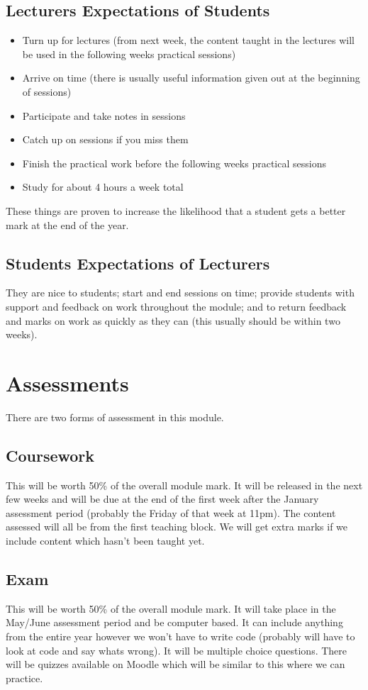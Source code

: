 \subsection*{Lecturers Expectations of Students}
\begin{itemize}
    \item Turn up for lectures (from next week, the content taught in the lectures will be used in the following weeks practical sessions)
    \item Arrive on time (there is usually useful information given out at the beginning of sessions)
    \item Participate and take notes in sessions
    \item Catch up on sessions if you miss them
    \item Finish the practical work before the following weeks practical sessions
    \item Study for about 4 hours a week total
\end{itemize}
These things are proven to increase the likelihood that a student gets a better mark at the end of the year.
\subsection*{Students Expectations of Lecturers}
They are nice to students; start and end sessions on time; provide students with support and feedback on work throughout the module; and to return feedback and marks on work as quickly as they can (this usually should be within two weeks).

\section*{Assessments}
There are two forms of assessment in this module.
\subsection*{Coursework}
This will be worth 50\% of the overall module mark. It will be released in the next few weeks and will be due at the end of the first week after the January assessment period (probably the Friday of that week at 11pm). The content assessed will all be from the first teaching block. We will get extra marks if we include content which hasn't been taught yet.
\subsection*{Exam}
This will be worth 50\% of the overall module mark. It will take place in the May/June assessment period and be computer based. It can include anything from the entire year however we won't have to write code (probably will have to look at code and say whats wrong). It will be multiple choice questions. There will be quizzes available on Moodle which will be similar to this where we can practice.

